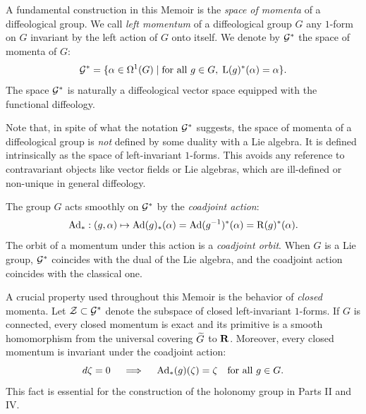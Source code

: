 \documentclass[10pt,reqno,letterpaper,twoside]{amsbook}
\begin{document}
  \begin{article}
    \label{subsec:Momenta}
    A fundamental construction in this Memoir is the \emph{space of momenta} of a diffeological group.
    We call \emph{left momentum} of a diffeological group $G$ any $1$-form on $G$ invariant by the left action of $G$ onto itself.
    We denote by $\mathcal{G}^*$ the space of momenta of $G$:
    \[
      \mathcal{G}^* = \{ \alpha \in \Omega^1(G) \mid \text{for all } g \in G, \; \operatorname{L}(g)^*(\alpha) = \alpha \}.
      \]
    The space $\mathcal{G}^*$ is naturally a diffeological vector space equipped with the functional diffeology.
    
    Note that,
    in spite of what the notation $\mathcal{G}^*$ suggests,
    the space of momenta of a diffeological group is \emph{not} defined by some duality with a Lie algebra.
    It is defined intrinsically as the space of left-invariant $1$-forms.
    This avoids any reference to contravariant objects like vector fields or Lie algebras,
    which are ill-defined or non-unique in general diffeology.
    
    The group $G$ acts smoothly on $\mathcal{G}^*$ by the \emph{coadjoint action}:
    \[
      \mathrm{Ad}_* : (g,\alpha) \mapsto \mathrm{Ad}(g)_*(\alpha) = \mathrm{Ad}(g^{-1})^*(\alpha) = \operatorname{R}(g)^*(\alpha).
      \]
    The orbit of a momentum under this action is a \emph{coadjoint orbit}.
    When $G$ is a Lie group,
    $\mathcal{G}^*$ coincides with the dual of the Lie algebra,
    and the coadjoint action coincides with the classical one.
    
    A crucial property used throughout this Memoir is the behavior of \emph{closed} momenta.
    Let $\mathcal{Z} \subset \mathcal{G}^*$ denote the subspace of closed left-invariant $1$-forms.
    If $G$ is connected,
    every closed momentum is exact and its primitive is a smooth homomorphism from the universal covering $\widetilde{G}$ to ${\mathbf{R}}$.
    Moreover,
    every closed momentum is invariant under the coadjoint action:
    \[
      d\zeta = 0 \quad\implies\quad \mathrm{Ad}_*(g)(\zeta) = \zeta \quad \text{for all } g \in G.
      \]
    This fact is essential for the construction of the holonomy group in Parts II and IV.
  \end{article}
  
\end{document}

